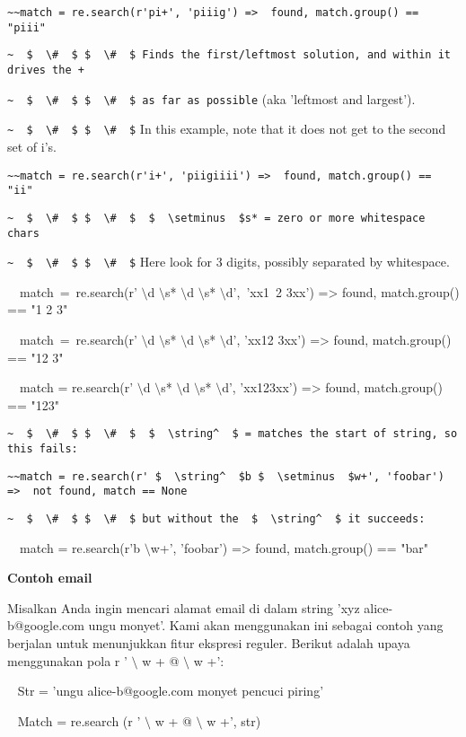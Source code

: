 \begin {enumerate}
\begin {enumerate}
\verb|~~match = re.search(r'pi+', 'piiig') =>  found, match.group() == "piii"|

\verb|~  $  \#  $ $  \#  $ Finds the first/leftmost solution, and within it drives the +|

\verb|~  $  \#  $ $  \#  $ as far as possible| (aka 'leftmost and largest').

\verb|~  $  \#  $ $  \#  $| In this example, note that it does not get to the second set of i's.

\verb|~~match = re.search(r'i+', 'piigiiii') =>  found, match.group() == "ii"|

\verb|~  $  \#  $ $  \#  $  $  \setminus  $s* = zero or more whitespace chars|

\verb|~  $  \#  $ $  \#  $| Here look for 3 digits, possibly separated by whitespace.

~~match~=~re.search(r' $  \setminus  $d $  \setminus  $s* $  \setminus  $d $  \setminus  $s* $  \setminus  $d',~'xx1~2   3xx') =>  found, match.group() == "1 2   3"

~~match~=~re.search(r' $  \setminus  $d $  \setminus  $s* $  \setminus  $d $  \setminus  $s* $  \setminus  $d', 'xx12  3xx') =>  found, match.group() == "12  3"

~~match = re.search(r' $  \setminus  $d $  \setminus  $s* $  \setminus  $d $  \setminus  $s* $  \setminus  $d', 'xx123xx') =>  found, match.group() == "123"

\verb|~  $  \#  $ $  \#  $  $  \string^  $ = matches the start of string, so this fails:|

\verb|~~match = re.search(r' $  \string^  $b $  \setminus  $w+', 'foobar') =>  not found, match == None|

\verb|~  $  \#  $ $  \#  $ but without the  $  \string^  $ it succeeds:|

~~match = re.search(r'b $  \setminus  $w+', 'foobar') =>  found, match.group() == "bar"

{\fontsize{14pt}{14pt}\selectfont \textbf{Contoh email} \\} \par
Misalkan Anda ingin mencari alamat email di dalam string 'xyz alice-b@google.com ungu monyet'. Kami akan menggunakan ini sebagai contoh yang berjalan untuk menunjukkan fitur ekspresi reguler. Berikut adalah upaya menggunakan pola r ' $  \setminus  $ w + @  $  \setminus  $ w +':

~ Str = 'ungu alice-b@google.com monyet pencuci piring'

~ Match = re.search (r ' $  \setminus  $ w + @  $  \setminus  $ w +', str)


\end{enumerate}
\end{enumerate}

